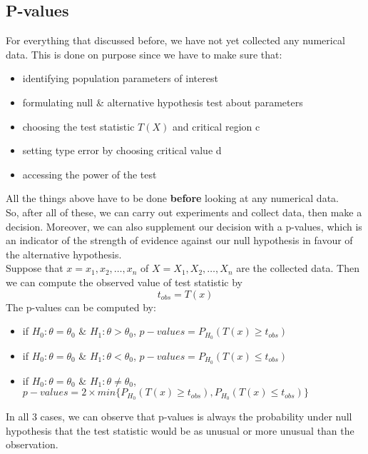 \documentclass[12pt ]{article}
\newcommand{\RomanNumeralCaps}[1] {\MakeUppercase{\romannumeral #1}}
\begin{document}
\subsection{P-values}
For everything that discussed before, we have not yet collected any numerical data. This is done on purpose since we have to make sure that:
\begin{itemize}
\item identifying population parameters of interest
\item formulating null \& alternative hypothesis test about parameters
\item choosing the test statistic $T(X)$ and critical region c
\item setting type  \RomanNumeralCaps{1} error by choosing critical value d
\item accessing the power of the test
\end{itemize}
All the things above have to be done \textbf{before} looking at any numerical data. \\
So, after all of these, we can carry out experiments and collect data, then make a decision. Moreover, we can also supplement our decision with a p-values, which is an indicator of the strength of evidence against our null hypothesis in favour of the alternative hypothesis. \\

Suppose that $x= x_{1}, x_{2}, \ldots, x_{n}$ of $X = X_{1}, X_{2}, \ldots, X_{n}$ are the collected data. Then we can compute the observed value of test statistic by
\begin{equation*}
t_{obs} = T(x)
\end{equation*}
The p-values can be computed by:
\begin{itemize}
\item if $H_{0}: \theta = \theta_{0}$ \& $H_{1}: \theta >\theta_{0}$, $p-values = P_{H_{0}}(T(x) \geq t_{obs})$
\item if $H_{0}: \theta = \theta_{0}$ \& $H_{1}: \theta <\theta_{0}$, $p-values = P_{H_{0}}(T(x) \leq t_{obs})$
\item if $H_{0}: \theta = \theta_{0}$ \& $H_{1}: \theta  \neq \theta_{0}$, $p-values = 2 \times min\{P_{H_{0}}(T(x) \geq t_{obs}), P_{H_{0}}(T(x) \leq t_{obs})\}$
\end{itemize}
In all 3 cases, we can observe that p-values is always the probability under null hypothesis that the test statistic would be as unusual or more unusual than the observation.\\
\end{document}
